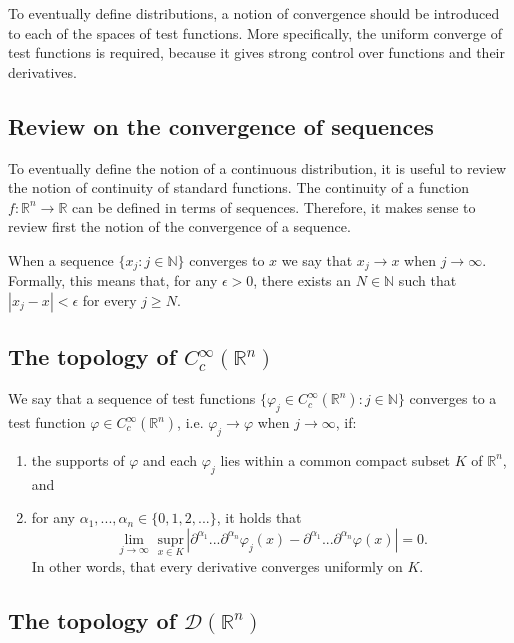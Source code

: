 \documentclass[aps,prl,twocolumn,groupedaddress]{revtex4-2}
\newcommand{\NN}{\mathbb{N}}
\newcommand{\RR}{\mathbb{R}}
\newcommand{\supr}[2]{\underset{#1}{\text{supr}}}
\begin{document}
To eventually define distributions, a notion of convergence should be introduced to each of the spaces of test functions.
More specifically, the uniform converge of test functions is required, because it gives strong control over functions and their derivatives.

\subsection{Review on the convergence of sequences}

To eventually define the notion of a continuous distribution, it is useful to review the notion of continuity of standard functions.
The continuity of a function $f:\RR^n \to \RR$ can be defined in terms of sequences.
Therefore, it makes sense to review first the notion of the convergence of a sequence.

When a sequence $\{x_j:j\in \NN\}$ converges to $x$ we say that $x_j\to x$ when $j\to \infty$.
Formally, this means that, for any $\epsilon>0$, there exists an $N\in \NN$ such that $|x_j-x|<\epsilon$ for every $j\geq N$.

\subsection{The topology of $C_c^{\infty}(\RR^n)$}

We say that a sequence of test functions $\{\varphi_j \in C_c^{\infty}(\RR^n) : j\in \NN\}$ converges to a test function $\varphi\in C_c^{\infty}(\RR^n)$, i.e. $\varphi_j\to \varphi$ when $j\to \infty$, if:
\begin{enumerate}

\item
the supports of $\varphi$ and each $\varphi_j$ lies within a common compact subset $K$ of $\RR^n$, and

\item for any $\alpha_1,...,\alpha_n \in \{0,1,2,...\}$, it holds that
$$
\lim_{j\to \infty}\,\,
\supr{x\in K}\,\, 
\left|
\partial^{\alpha_1}...\partial^{\alpha_n}
\varphi_j(x)
-
\partial^{\alpha_1}...\partial^{\alpha_n}
\varphi(x)
\right| = 0.
$$
In other words, that every derivative converges uniformly on $K$.

\end{enumerate}

\subsection{The topology of $\mathcal{D}(\RR^n)$}
\end{document}

